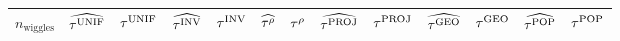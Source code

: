 \begin{landscape}
    \begin{table}[p]
        \begin{tabular}{r|rrrrrrrrrrrr}
            \hline
            \(n_{\mathrm{wiggles}}\) & \(\widehat{\tau^{\mathrm{UNIF}}}\) & \(\tau^{\mathrm{UNIF}}\) & \(\widehat{\tau^{\mathrm{INV}}}\) & \(\tau^{\mathrm{INV}}\) & \(\widehat{\tau^{\rho}}\) & \(\tau^{\rho}\) & \(\widehat{\tau^{\mathrm{PROJ}}}\) & \(\tau^{\mathrm{PROJ}}\) & \(\widehat{\tau^{\mathrm{GEO}}}\) & \(\tau^{\mathrm{GEO}}\) & \(\widehat{\tau^{\mathrm{POP}}}\) & \(\tau^{\mathrm{POP}}\)\\
            \hline

\end{tabular}
\end{table}
\end{landscape}
